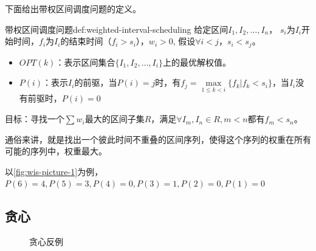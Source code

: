 下面给出带权区间调度问题的定义。

\begin{definition}{带权区间调度问题}{def:weighted-interval-scheduling}
	给定区间$I_1, I_2, \ldots, I_n$，
	$s_i$为$I_i$开始时间，$f_i$为$I_i$的结束时间（$f_i>s_i$），$w_i>0$, 假设$\forall i < j$，$ s_i<s_j$。
	\begin{itemize}
		\item $OPT(k)$：表示区间集合$\{ I_1, I_2, \ldots , I_i \}$上的最优解权值。
		\item $P(i)$：表示$I_i$的前驱，当$P(i)=j$时，有$f_j=\max\limits_{1 \leq k < i}\{f_k | f_k < s_i\}$，当$I_i$没有前驱时，$P(i)=0$
	\end{itemize}
	目标：寻找一个$\sum w_i$最大的区间子集$R$，满足$\forall I_m,I_n \in R, m < n \text{都有} f_m < s_n$。
\end{definition}

通俗来讲，就是找出一个彼此时间不重叠的区间序列，使得这个序列的权重在所有可能的序列中，权重最大。

\begin{remark}
	以\autoref{fig:wis-picture-1}为例，$P(6)=4, P(5)=3, P(4)=0, P(3)=1, P(2)=0, P(1)=0$
\end{remark}

\subsection{贪心}

\begin{figure}[hbt!]
	\centering
	\begin{subfigure}{.3\textwidth}
		\centering
		\caption{}\label{fig:wis-counterexample1}
	\end{subfigure}
	\begin{subfigure}{.3\textwidth}
		\centering
		\caption{}\label{fig:wis-counterexample2}
	\end{subfigure}
	\begin{subfigure}{.3\textwidth}
		\centering
		\caption{}\label{fig:wis-counterexample3}
	\end{subfigure}
	\caption{贪心反例}\label{fig:wis-counterexample}
\end{figure}

